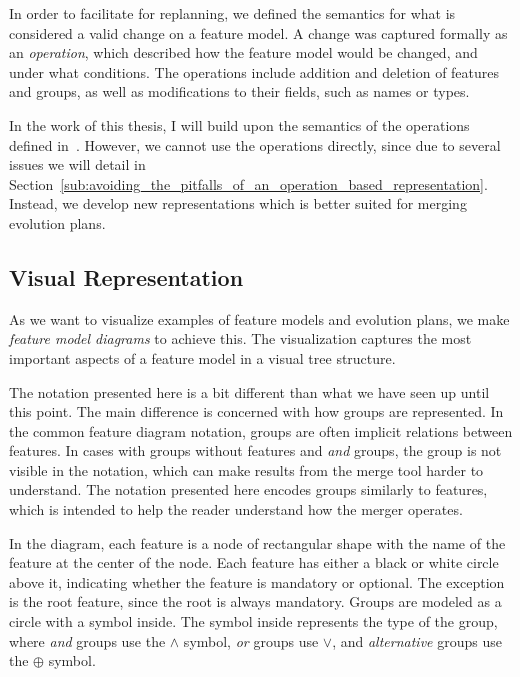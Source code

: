 \documentclass[a4paper,english]{ifimaster}
\begin{document}
In order to facilitate for replanning, we defined the semantics for what is considered a valid change on a feature model. A change was captured formally as an \textit{operation}, which described how the feature model would be changed, and under what conditions. The operations include addition and deletion of features and groups, as well as modifications to their fields, such as names or types.

In the work of this thesis, I will build upon the semantics of the operations defined in~\cite{cite:consistency_preserving_evolution_planning}. However, we cannot use the operations directly, since due to several issues we will detail in Section~\vref{sub:avoiding_the_pitfalls_of_an_operation_based_representation}. Instead, we develop new representations which is better suited for merging evolution plans.

\subsection{Visual Representation}%
\label{sub:visual_representation}

As we want to visualize examples of feature models and evolution plans, we make \textit{feature model diagrams} to achieve this. The visualization captures the most important aspects of a feature model in a visual tree structure. 

The notation presented here is a bit different than what we have seen up until this point. The main difference is concerned with how groups are represented. In the common feature diagram notation, groups are often implicit relations between features. In cases with groups without features and \textit{and} groups, the group is not visible in the notation, which can make results from the merge tool harder to understand. The notation presented here encodes groups similarly to features, which is intended to help the reader understand how the merger operates.

In the diagram, each feature is a node of rectangular shape with the name of the feature at the center of the node. Each feature has either a black or white circle above it, indicating whether the feature is mandatory or optional. The exception is the root feature, since the root is always mandatory. Groups are modeled as a circle with a symbol inside. The symbol inside represents the type of the group, where \textit{and} groups use the $\land$ symbol, \textit{or} groups use $\lor$, and \textit{alternative} groups use the $\oplus$ symbol.
\end{document}
